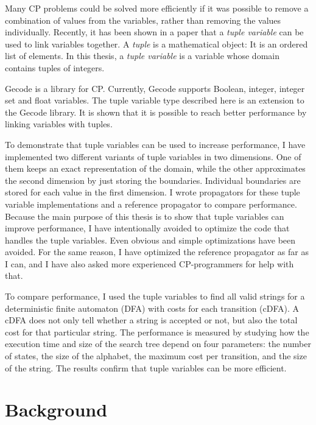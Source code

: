 \documentclass[a4paper,11pt]{article}
\begin{document}
Many CP problems could be solved more efficiently if it was possible to remove a combination of values from the variables, rather than removing the values individually. Recently, it has been shown in a paper \cite{Monette771427} that a \textit{tuple variable} can be used to link variables together. A \textit{tuple} is a mathematical object: It is an ordered list of elements. In this thesis, a \textit{tuple variable} is a variable whose domain contains tuples of integers. 

Gecode is a library for CP. Currently, Gecode supports Boolean, integer, integer set and float variables. The tuple variable type described here is an extension to the Gecode library. It is shown that it is possible to reach better performance by linking variables with tuples.

To demonstrate that tuple variables can be used to increase performance, I have implemented two different variants of tuple variables in two dimensions. One of them keeps an exact representation of the domain, while the other approximates the second dimension by just storing the boundaries. Individual boundaries are stored for each value in the first dimension. I wrote propagators for these tuple variable implementations and a reference propagator to compare performance. Because the main purpose of this thesis is to show that tuple variables can improve performance, I have intentionally avoided to optimize the code that handles the tuple variables. Even obvious and simple optimizations have been avoided. For the same reason, I have optimized the reference propagator as far as I can, and I have also asked more experienced CP-programmers for help with that.

To compare performance, I used the tuple variables to find all valid strings for a deterministic finite automaton (DFA) with costs for each transition (cDFA). A cDFA does not only tell whether a string is accepted or not, but also the total cost for that particular string. The performance is measured by studying how the execution time and size of the search tree depend on four parameters: the number of states, the size of the alphabet, the maximum cost per transition, and the size of the string. The results confirm that tuple variables can be more efficient.

\section{Background}
\end{document}
